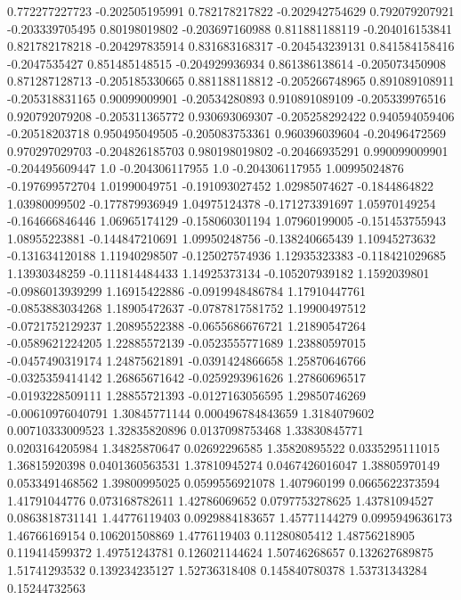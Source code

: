 0.772277227723  -0.202505195991
 0.782178217822  -0.202942754629
 0.792079207921  -0.203339705495
  0.80198019802  -0.203697160988
 0.811881188119  -0.204016153841
 0.821782178218  -0.204297835914
 0.831683168317  -0.204543239131
 0.841584158416    -0.2047535427
 0.851485148515  -0.204929936934
 0.861386138614  -0.205073450908
 0.871287128713  -0.205185330665
 0.881188118812  -0.205266748965
 0.891089108911  -0.205318831165
  0.90099009901   -0.20534280893
 0.910891089109  -0.205339976516
 0.920792079208  -0.205311365772
 0.930693069307  -0.205258292422
 0.940594059406   -0.20518203718
 0.950495049505  -0.205083753361
 0.960396039604   -0.20496472569
 0.970297029703  -0.204826185703
 0.980198019802   -0.20466935291
 0.990099009901  -0.204495609447
            1.0  -0.204306117955
            1.0  -0.204306117955
  1.00995024876  -0.197699572704
  1.01990049751  -0.191093027452
  1.02985074627    -0.1844864822
  1.03980099502  -0.177879936949
  1.04975124378  -0.171273391697
  1.05970149254  -0.164666846446
  1.06965174129  -0.158060301194
  1.07960199005  -0.151453755943
  1.08955223881  -0.144847210691
  1.09950248756  -0.138240665439
  1.10945273632  -0.131634120188
  1.11940298507  -0.125027574936
  1.12935323383  -0.118421029685
  1.13930348259  -0.111814484433
  1.14925373134  -0.105207939182
   1.1592039801  -0.0986013939299
  1.16915422886  -0.0919948486784
  1.17910447761  -0.0853883034268
  1.18905472637  -0.0787817581752
  1.19900497512  -0.0721752129237
  1.20895522388  -0.0655686676721
  1.21890547264  -0.0589621224205
  1.22885572139  -0.0523555771689
  1.23880597015  -0.0457490319174
  1.24875621891  -0.0391424866658
  1.25870646766  -0.0325359414142
  1.26865671642  -0.0259293961626
  1.27860696517  -0.0193228509111
  1.28855721393  -0.0127163056595
  1.29850746269  -0.00610976040791
  1.30845771144  0.000496784843659
   1.3184079602  0.00710333009523
  1.32835820896  0.0137098753468
  1.33830845771  0.0203164205984
  1.34825870647    0.02692296585
  1.35820895522  0.0335295111015
  1.36815920398  0.0401360563531
  1.37810945274  0.0467426016047
  1.38805970149  0.0533491468562
  1.39800995025  0.0599556921078
    1.407960199  0.0665622373594
  1.41791044776   0.073168782611
  1.42786069652  0.0797753278625
  1.43781094527  0.0863818731141
  1.44776119403  0.0929884183657
  1.45771144279  0.0995949636173
  1.46766169154   0.106201508869
   1.4776119403    0.11280805412
  1.48756218905   0.119414599372
  1.49751243781   0.126021144624
  1.50746268657   0.132627689875
  1.51741293532   0.139234235127
  1.52736318408   0.145840780378
  1.53731343284    0.15244732563
